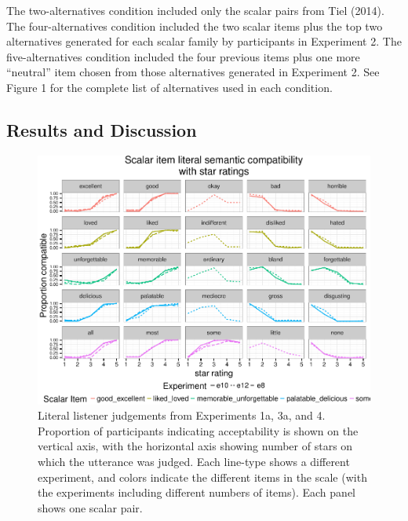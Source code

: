 \documentclass[10pt, letterpaper]{article}
\newenvironment{CodeChunk}{}{}
\begin{document}
The two-alternatives condition included only the scalar pairs from Tiel
(2014). The four-alternatives condition included the two scalar items
plus the top two alternatives generated for each scalar family by
participants in Experiment 2. The five-alternatives condition included
the four previous items plus one more ``neutral'' item chosen from those
alternatives generated in Experiment 2. See Figure 1 for the complete
list of alternatives used in each condition.

\subsection{Results and Discussion}\label{results-and-discussion}

\begin{CodeChunk}
\begin{figure}[t]

{\centering \includegraphics{figs/exp1Plots-1} 

}

\caption[Literal listener judgements from Experiments 1a, 3a, and 4]{Literal listener judgements from Experiments 1a, 3a, and 4. Proportion of participants indicating acceptability is shown on the vertical axis, with the horizontal axis showing number of stars on which the utterance was judged. Each line-type shows a different experiment, and colors indicate the different items in the scale (with the experiments including different numbers of items).  Each panel shows one scalar pair.}\label{fig:exp1Plots}
\end{figure}
\end{CodeChunk}
\end{document}
